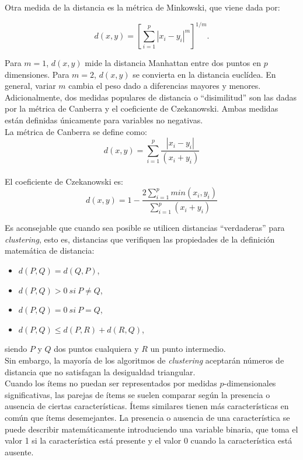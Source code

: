 \documentclass[a4paper, 20pt]{article}
\begin{document}
Otra medida de la distancia es la métrica de Minkowski, que viene dada por:

$$ d(x,y)=\left  [\sum_{i=1}^{p}{|x_i-y_i|^m} \right ]^{1/m}.$$

Para $m=1$, $d(x,y)$ mide la distancia Manhattan entre dos puntos en $p$ dimensiones. Para $m=2$,  $d(x,y)$ se convierta en la distancia euclídea. En general, variar $m$ cambia el peso dado a diferencias mayores y menores.\\

Adicionalmente, dos medidas populares de distancia o ``disimilitud'' son las dadas por la métrica de Canberra y el coeficiente de Czekanowski. Ambas medidas están definidas únicamente para variables no negativas.\\

La métrica de Canberra se define como: \[d(x,y)=\sum_{i=1}^{p}{\frac{|x_i-y_i|}{(x_i+y_i)}}\]\\

El coeficiente de Czekanowski es: \[d(x,y)=1-\frac{2\sum_{i=1}^{p}{min(x_i,y_i)}}{\sum_{i=1}^{p}{(x_i+y_i)}}\]

Es aconsejable que cuando sea posible se utilicen distancias ``verdaderas'' para \textit{clustering}, esto es, distancias que verifiquen las propiedades de la definición matemática de distancia:
\begin{itemize}
\item $d(P,Q)=d(Q,P)$,
\item $d(P,Q)>0\ si\ P\neq Q$,
\item $d(P,Q)=0\ si\ P=Q$,
\item $d(P,Q)\leq d(P,R)+d(R,Q)$,
\end{itemize}

siendo $P$ y $Q$ dos puntos cualquiera y $R$ un punto intermedio.\\ 

Sin embargo, la mayoría de los algoritmos de \textit{clustering} aceptarán números de distancia que no satisfagan la desigualdad triangular.\\

Cuando los ítems no puedan ser representados por medidas $p$-dimensionales significativas, las parejas de ítems se suelen comparar según la presencia o ausencia de ciertas características. Ítems similares tienen más características en común que ítems desemejantes. La presencia o ausencia de una característica se puede describir matemáticamente introduciendo una variable binaria, que toma el valor 1 si la característica está presente y el valor 0 cuando la característica está ausente. 
\end{document}

